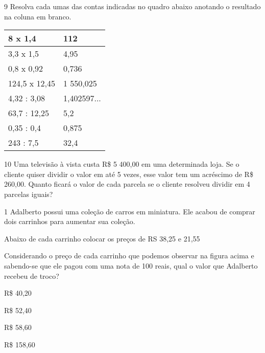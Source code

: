 \num{9} Resolva cada umas das contas indicadas no quadro abaixo anotando o
resultado na coluna em branco.

\begin{longtable}[]{@{}ll@{}}
\toprule
8 x 1,4 & 112\tabularnewline
\midrule
\endhead
3,3 x 1,5 & 4,95\tabularnewline
0,8 x 0,92 & 0,736\tabularnewline
124,5 x 12,45 & 1 550,025\tabularnewline
4,32 : 3,08 & 1,402597...\tabularnewline
63,7 : 12,25 & 5,2\tabularnewline
0,35 : 0,4 & 0,875\tabularnewline
243 : 7,5 & 32,4\tabularnewline
\bottomrule
\end{longtable}

\num{10} Uma televisão à vista custa R\$ 5 400,00 em uma determinada loja.
Se o cliente quiser dividir o valor em até 5 vezes, esse valor tem um
acréscimo de R\$ 260,00. Quanto ficará o valor de cada parcela se o
cliente resolveu dividir em 4 parcelas iguais?




\num{1} Adalberto possui uma coleção de carros em miniatura. Ele acabou de
comprar dois carrinhos para aumentar sua coleção.



Abaixo de cada carrinho colocar os preços de RS 38,25 e 21,55

Considerando o preço de cada carrinho que podemos observar na figura
acima e sabendo-se que ele pagou com uma nota de 100 reais, qual o valor
que Adalberto recebeu de troco?

\begin{escolha}
\item
  R\$ 40,20
\item
  R\$ 52,40
\item
  R\$ 58,60
\item
  R\$ 158,60
\end{escolha}


